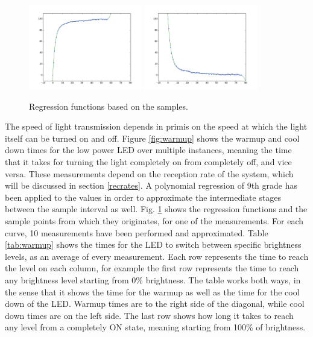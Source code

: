 \begin{figure}[hbt]
\centering
  \includegraphics[height=140px]{img/regrU}
    \includegraphics[height=140px]{img/regrD}
  \caption{Regression functions based on the samples.}
  \label{fig:regr}
\end{figure}


The speed of light transmission depends in primis on the speed at which the light itself can be turned on and off.
Figure \ref{fig:warmup} shows the warmup and cool down times for the low power LED over multiple instances, meaning the time that it takes for turning the light completely on from completely off, and vice versa.
These measurements depend on the reception rate of the system, which will be discussed in section \ref{recrates}.
A polynomial regression of 9th grade has been applied to the values in order to approximate the intermediate stages between the sample interval as well.
Fig. \ref{fig:regr} shows the regression functions and the sample points from which they originates, for one of the measurements.
For each curve, 10 measurements have been performed and approximated.
Table \ref{tab:warmup} shows the times for the LED to switch between specific brightness levels, as an average of every measurement.
Each row represents the time to reach the level on each column, for example the first row represents the time to reach any brightness level starting from 0\% brightness.
The table works both ways, in the sense that it shows the time for the warmup as well as the time for the cool down of the LED.
Warmup times are to the right side of the diagonal, while cool down times are on the left side.
The last row shows how long it takes to reach any level from a completely ON state, meaning starting from 100\% of brightness.

